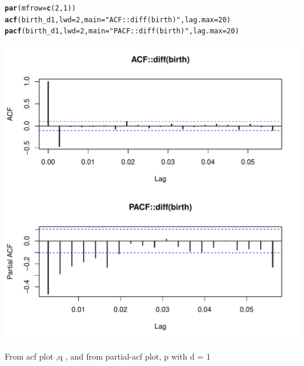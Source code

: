 \documentclass[10pt]{article}\usepackage[]{graphicx}\usepackage[]{color}
\makeatletter
\def\maxwidth{ %
  \ifdim\Gin@nat@width>\linewidth
    \linewidth
  \else
    \Gin@nat@width
  \fi
}
\newcommand{\hlnum}[1]{\textcolor[rgb]{0.686,0.059,0.569}{#1}}%
\newcommand{\hlstr}[1]{\textcolor[rgb]{0.192,0.494,0.8}{#1}}%
\newcommand{\hlstd}[1]{\textcolor[rgb]{0.345,0.345,0.345}{#1}}%
\newcommand{\hlkwc}[1]{\textcolor[rgb]{0.333,0.667,0.333}{#1}}%
\newcommand{\hlkwd}[1]{\textcolor[rgb]{0.737,0.353,0.396}{\textbf{#1}}}%
\newenvironment{kframe}{%
 \def\at@end@of@kframe{}%
 \ifinner\ifhmode%
  \def\at@end@of@kframe{\end{minipage}}%
  \begin{minipage}{\columnwidth}%
 \fi\fi%
 \def\FrameCommand##1{\hskip\@totalleftmargin \hskip-\fboxsep
 \colorbox{shadecolor}{##1}\hskip-\fboxsep
     \hskip-\linewidth \hskip-\@totalleftmargin \hskip\columnwidth}%
 \MakeFramed {\advance\hsize-\width
   \@totalleftmargin\z@ \linewidth\hsize
   \@setminipage}}%
 {\par\unskip\endMakeFramed%
 \at@end@of@kframe}
\newenvironment{knitrout}{}{} %
\makeatother
\begin{document}
\begin{knitrout}
\begin{kframe}
\begin{alltt}
\hlkwd{par}\hlstd{(}\hlkwc{mfrow}\hlstd{=}\hlkwd{c}\hlstd{(}\hlnum{2}\hlstd{,}\hlnum{1}\hlstd{))}
\hlkwd{acf}\hlstd{(birth_d1,}\hlkwc{lwd} \hlstd{=} \hlnum{2}\hlstd{,} \hlkwc{main} \hlstd{=}  \hlstr{"ACF::diff(birth)"}\hlstd{,}\hlkwc{lag.max} \hlstd{=} \hlnum{20}\hlstd{)}
\hlkwd{pacf}\hlstd{(birth_d1,}\hlkwc{lwd} \hlstd{=} \hlnum{2}\hlstd{,} \hlkwc{main} \hlstd{=}  \hlstr{"PACF::diff(birth)"}\hlstd{,}\hlkwc{lag.max} \hlstd{=} \hlnum{20}\hlstd{)}
\end{alltt}
\end{kframe}
\includegraphics[width=\maxwidth]{figure/unnamed-chunk-9-2} 

\end{knitrout}
From acf plot ,q , and from partial-acf plot, p  with d = 1
\end{document}
